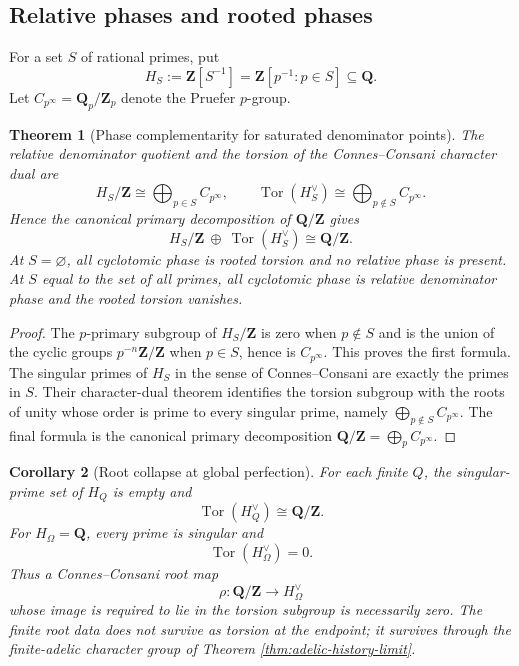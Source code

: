 \documentclass[11pt]{amsart}
\numberwithin{equation}{section}
\newtheorem{theorem}{Theorem}[section]
\newtheorem{corollary}[theorem]{Corollary}
\theoremstyle{definition}
\newcommand{\Z}{\mathbf Z}
\newcommand{\Q}{\mathbf Q}
\newcommand{\Tor}{\operatorname{Tor}}
\begin{document}
\subsection{Relative phases and rooted phases}

For a set $S$ of rational primes, put
\[
H_S:=\Z[S^{-1}]
=\Z[p^{-1}:p\in S]\subseteq\Q.
\]
Let $C_{p^\infty}=\Q_p/\Z_p$ denote the Pruefer $p$-group.

\begin{theorem}[Phase complementarity for saturated denominator points]
\label{thm:phase-complementarity}
The relative denominator quotient and the torsion of the Connes--Consani
character dual are
\[
H_S/\Z\cong\bigoplus_{p\in S}C_{p^\infty},
\qquad
\Tor(H_S^\vee)
\cong\bigoplus_{p\notin S}C_{p^\infty}.
\]
Hence the canonical primary decomposition of $\Q/\Z$ gives
\[
\boxed{
H_S/\Z\ \oplus\ \Tor(H_S^\vee)
\cong\Q/\Z.}
\]
At $S=\varnothing$, all cyclotomic phase is rooted torsion and no relative
phase is present.  At $S$ equal to the set of all primes, all cyclotomic
phase is relative denominator phase and the rooted torsion vanishes.
\end{theorem}

\begin{proof}
The $p$-primary subgroup of $H_S/\Z$ is zero when $p\notin S$ and is the
union of the cyclic groups $p^{-n}\Z/\Z$ when $p\in S$, hence is
$C_{p^\infty}$.  This proves the first formula.  The singular primes of
$H_S$ in the sense of Connes--Consani are exactly the primes in $S$.
Their character-dual theorem identifies the torsion subgroup with the
roots of unity whose order is prime to every singular prime, namely
$\bigoplus_{p\notin S}C_{p^\infty}$.  The final formula is the canonical
primary decomposition
$\Q/\Z=\bigoplus_pC_{p^\infty}$.
\end{proof}

\begin{corollary}[Root collapse at global perfection]
\label{cor:root-collapse-global-perfection}
For each finite $Q$, the singular-prime set of $H_Q$ is empty and
\[
\Tor(H_Q^\vee)\cong\Q/\Z.
\]
For $H_\Omega=\Q$, every prime is singular and
\[
\Tor(H_\Omega^\vee)=0.
\]
Thus a Connes--Consani root map
\[
\rho:\Q/\Z\longrightarrow H_\Omega^\vee
\]
whose image is required to lie in the torsion subgroup is necessarily
zero.  The finite root data does not survive as torsion at the endpoint;
it survives through the finite-adelic character group of Theorem
\ref{thm:adelic-history-limit}.
\end{corollary}
\end{document}
